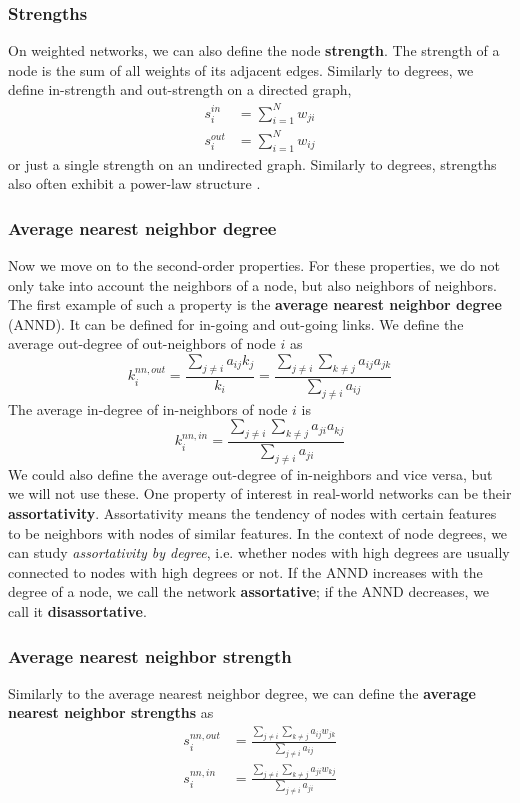 \subsubsection{Strengths}
On weighted networks, we can also define the node \textbf{strength}. The strength of a node is the sum of all weights of its adjacent edges. Similarly to degrees, we define in-strength and out-strength on a directed graph,
\begin{align}
s_i^{in} &= \sum_{i=1}^{N} w_{ji} \\
s_i^{out} &= \sum_{i=1}^{N} w_{ij}
\end{align}
or just a single strength on an undirected graph. Similarly to degrees, strengths also often exhibit a power-law structure \cite{Yook2001}.
\subsubsection{Average nearest neighbor degree}
Now we move on to the second-order properties. For these properties, we do not only take into account the neighbors of a node, but also neighbors of neighbors. The first example of such a property is the \textbf{average nearest neighbor degree} (ANND). It can be defined for in-going and out-going links. We define the average out-degree of out-neighbors of node $i$ as
\begin{equation}
k_{i}^{nn,out} = \frac{\sum_{j\neq i}a_{ij} k_j}{k_i} = \frac{\sum_{j\neq i}\sum_{k\neq j}a_{ij} a_{jk}}{\sum_{j\neq i}a_{ij}}
\end{equation}
The average in-degree of in-neighbors of node $i$ is
\begin{equation}
k_{i}^{nn,in} = \frac{\sum_{j\neq i}\sum_{k\neq j}a_{ji} a_{kj}}{\sum_{j\neq i}a_{ji}}
\end{equation}
We could also define the average out-degree of in-neighbors and vice versa, but we will not use these.
One property of interest in real-world networks can be their \textbf{assortativity}. Assortativity means the tendency of nodes with certain features to be neighbors with nodes of similar features. In the context of node degrees, we can study \textit{assortativity by degree}, i.e. whether nodes with high degrees are usually connected to nodes with high degrees or not. If the ANND increases with the degree of a node, we call the network \textbf{assortative}; if the ANND decreases, we call it \textbf{disassortative}.

\subsubsection{Average nearest neighbor strength}
Similarly to the average nearest neighbor degree, we can define the \textbf{average nearest neighbor strengths} as
\begin{align}
s_{i}^{nn,out} &= \frac{\sum_{j\neq i}\sum_{k\neq j}a_{ij} w_{jk}}{\sum_{j\neq i}a_{ij}} \\
s_{i}^{nn,in} &= \frac{\sum_{j\neq i}\sum_{k\neq j}a_{ji} w_{kj}}{\sum_{j\neq i}a_{ji}}
\end{align}

